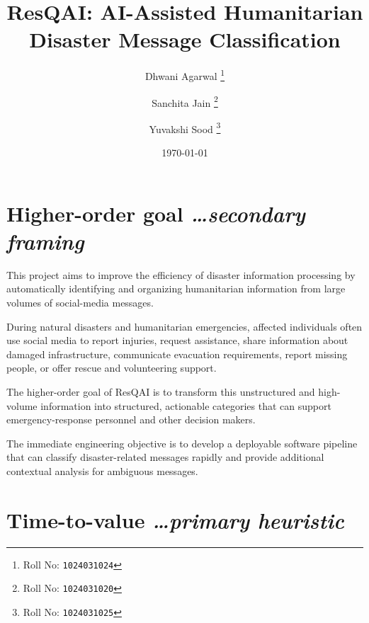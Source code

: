 \documentclass[11pt,a4paper]{article}
\title{ResQAI: AI-Assisted Humanitarian Disaster Message Classification}
\author{
  Dhwani Agarwal%
  \thanks{Roll No: \texttt{1024031024}}
  \and
  Sanchita Jain%
  \thanks{Roll No: \texttt{1024031020}}
  \and
  Yuvakshi Sood%
  \thanks{Roll No: \texttt{1024031025}}
}
\date{\today}
\newcommand{\BvrHint}[1]{%
  {\normalfont\normalsize\itshape\hfill #1}}
\begin{document}
\maketitle


\section{Higher-order goal%
  \BvrHint{\ldots secondary framing}}

This project aims to improve the efficiency of disaster information
processing by automatically identifying and organizing humanitarian
information from large volumes of social-media messages.

During natural disasters and humanitarian emergencies, affected individuals
often use social media to report injuries, request assistance, share
information about damaged infrastructure, communicate evacuation
requirements, report missing people, or offer rescue and volunteering
support.

The higher-order goal of ResQAI is to transform this unstructured and
high-volume information into structured, actionable categories that can
support emergency-response personnel and other decision makers.

The immediate engineering objective is to develop a deployable software
pipeline that can classify disaster-related messages rapidly and provide
additional contextual analysis for ambiguous messages.


\section{Time-to-value %
  \BvrHint{\ldots primary heuristic}}
\end{document}
